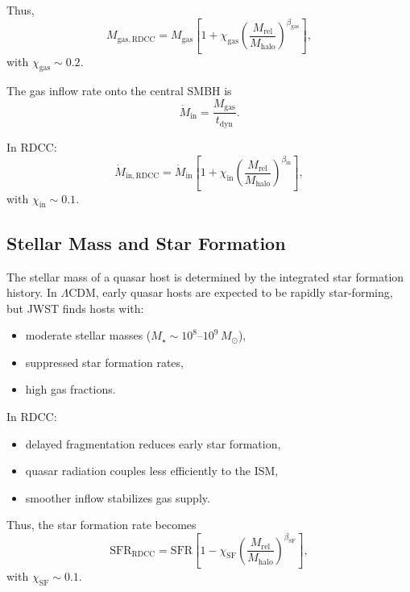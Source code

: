 \documentclass[11pt,a4paper]{article}
\begin{document}
Thus,
\begin{equation}
M_{\mathrm{gas,RDCC}}
=
M_{\mathrm{gas}}
\left[
1
+
\chi_{\mathrm{gas}}
\left(
\frac{M_{\mathrm{rel}}}{M_{\mathrm{halo}}}
\right)^{\beta_{\mathrm{gas}}}
\right],
\end{equation}
with $\chi_{\mathrm{gas}} \sim 0.2$.

The gas inflow rate onto the central SMBH is
\begin{equation}
\dot{M}_{\mathrm{in}}
=
\frac{M_{\mathrm{gas}}}{t_{\mathrm{dyn}}}.
\end{equation}

In RDCC:
\begin{equation}
\dot{M}_{\mathrm{in,RDCC}}
=
\dot{M}_{\mathrm{in}}
\left[
1
+
\chi_{\mathrm{in}}
\left(
\frac{M_{\mathrm{rel}}}{M_{\mathrm{halo}}}
\right)^{\beta_{\mathrm{in}}}
\right],
\end{equation}
with $\chi_{\mathrm{in}} \sim 0.1$.

\subsection{Stellar Mass and Star Formation}

The stellar mass of a quasar host is determined by the integrated star formation history.
In $\Lambda$CDM, early quasar hosts are expected to be rapidly star-forming, but JWST finds
hosts with:
\begin{itemize}
\item moderate stellar masses ($M_{\star} \sim 10^{8}$–$10^{9}\,M_{\odot}$),
\item suppressed star formation rates,
\item high gas fractions.
\end{itemize}

In RDCC:
\begin{itemize}
\item delayed fragmentation reduces early star formation,
\item quasar radiation couples less efficiently to the ISM,
\item smoother inflow stabilizes gas supply.
\end{itemize}

Thus, the star formation rate becomes
\begin{equation}
\mathrm{SFR}_{\mathrm{RDCC}}
=
\mathrm{SFR}
\left[
1
-
\chi_{\mathrm{SF}}
\left(
\frac{M_{\mathrm{rel}}}{M_{\mathrm{halo}}}
\right)^{\beta_{\mathrm{SF}}}
\right],
\end{equation}
with $\chi_{\mathrm{SF}} \sim 0.1$.
\end{document}
